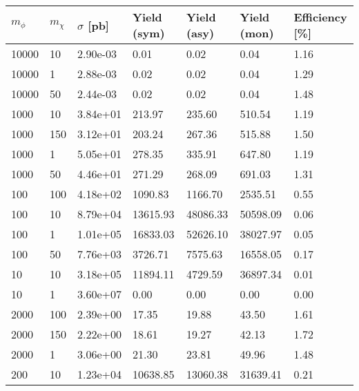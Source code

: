 \begin{table}
\small
\centering
\begin{tabular}{lllllll}
\hline
$m_\phi$ & $m_\chi$ & $\sigma$ [pb] & Yield (sym) & Yield (asy) & Yield (mon) & Efficiency [\%] \\ \hline
10000     &   10        &   2.90e-03  &   0.01      &   0.02      &   0.04      &   1.16      \\ 
10000     &   1         &   2.88e-03  &   0.02      &   0.02      &   0.04      &   1.29      \\ 
10000     &   50        &   2.44e-03  &   0.02      &   0.02      &   0.04      &   1.48      \\ 
1000      &   10        &   3.84e+01  &   213.97    &   235.60    &   510.54    &   1.19      \\ 
1000      &   150       &   3.12e+01  &   203.24    &   267.36    &   515.88    &   1.50      \\ 
1000      &   1         &   5.05e+01  &   278.35    &   335.91    &   647.80    &   1.19      \\ 
1000      &   50        &   4.46e+01  &   271.29    &   268.09    &   691.03    &   1.31      \\ 
100       &   100       &   4.18e+02  &   1090.83   &   1166.70   &   2535.51   &   0.55      \\ 
100       &   10        &   8.79e+04  &   13615.93  &   48086.33  &   50598.09  &   0.06      \\ 
100       &   1         &   1.01e+05  &   16833.03  &   52626.10  &   38027.97  &   0.05      \\ 
100       &   50        &   7.76e+03  &   3726.71   &   7575.63   &   16558.05  &   0.17      \\ 
10        &   10        &   3.18e+05  &   11894.11  &   4729.59   &   36897.34  &   0.01      \\ 
10        &   1         &   3.60e+07  &   0.00      &   0.00      &   0.00      &   0.00      \\ 
2000      &   100       &   2.39e+00  &   17.35     &   19.88     &   43.50     &   1.61      \\ 
2000      &   150       &   2.22e+00  &   18.61     &   19.27     &   42.13     &   1.72      \\ 
2000      &   1         &   3.06e+00  &   21.30     &   23.81     &   49.96     &   1.48      \\ 
200       &   10        &   1.23e+04  &   10638.85  &   13060.38  &   31639.41  &   0.21      \\ 

\end{tabular}
\end{table}
